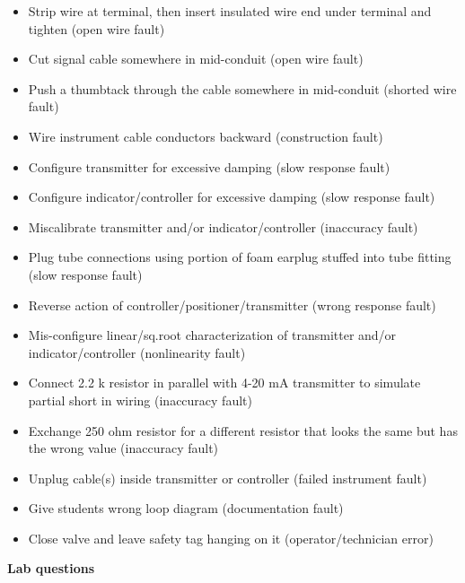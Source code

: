 \begin{itemize}
\goodbreak
\item{} Strip wire at terminal, then insert insulated wire end under terminal and tighten (open wire fault)
\item{} Cut signal cable somewhere in mid-conduit (open wire fault)
\item{} Push a thumbtack through the cable somewhere in mid-conduit (shorted wire fault)
\item{} Wire instrument cable conductors backward (construction fault)
\item{} Configure transmitter for excessive damping (slow response fault)
\item{} Configure indicator/controller for excessive damping (slow response fault)
\item{} Miscalibrate transmitter and/or indicator/controller (inaccuracy fault)
\item{} Plug tube connections using portion of foam earplug stuffed into tube fitting (slow response fault)
\item{} Reverse action of controller/positioner/transmitter (wrong response fault)
\item{} Mis-configure linear/sq.root characterization of transmitter and/or indicator/controller (nonlinearity fault)
\item{} Connect 2.2 k resistor in parallel with 4-20 mA transmitter to simulate partial short in wiring (inaccuracy fault)
\item{} Exchange 250 ohm resistor for a different resistor that looks the same but has the wrong value (inaccuracy fault) 
\item{} Unplug cable(s) inside transmitter or controller (failed instrument fault)
\item{} Give students wrong loop diagram (documentation fault)
\item{} Close valve and leave safety tag hanging on it (operator/technician error)
\end{itemize}




















\vfil \eject

\noindent
{\bf Lab questions}

